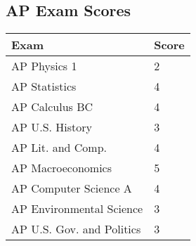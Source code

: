 \documentclass[12pt]{article}
\begin{document}
\subsection{AP Exam Scores}
\begin{table}[H]
  \centering
  \vspace{-0.8em}
  \begin{tabular}{l|l}
    Exam    & Score \\
    \hline
    AP Physics 1              & 2 \\
    AP Statistics             & 4 \\
    AP Calculus BC            & 4 \\
    AP U.S. History           & 3 \\
    AP Lit. and Comp.         & 4 \\
    AP Macroeconomics         & 5 \\
    AP Computer Science A     & 4 \\
    AP Environmental Science  & 3 \\
    AP U.S. Gov. and Politics & 3 \\
  \end{tabular}
\end{table}
\end{document}
